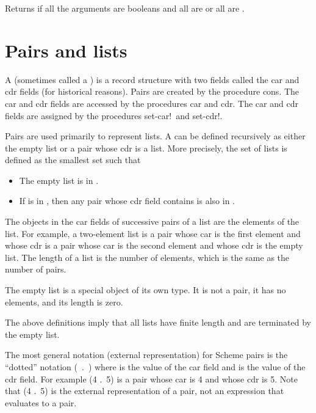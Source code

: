 \begin{entry}{%
}

Returns \schtrue{} if all the arguments are booleans and all 
are \schtrue{} or all are \schfalse{}.

\end{entry}
 
\section{Pairs and lists}
\label{listsection}

A  (sometimes called a ) is a
record structure with two fields called the car and cdr fields (for
historical reasons).  Pairs are created by the procedure {\cf cons}.
The car and cdr fields are accessed by the procedures {\cf car} and
{\cf cdr}.  The car and cdr fields are assigned by the procedures
{\cf set-car!}\ and {\cf set-cdr!}.

Pairs are used primarily to represent lists.  A  can
be defined recursively as either the empty list or a pair whose
cdr is a list.  More precisely, the set of lists is defined as the smallest
set  such that

\begin{itemize}
\item The empty list is in .
\item If  is in , then any pair whose cdr field contains
       is also in .
\end{itemize}

The objects in the car fields of successive pairs of a list are the
elements of the list.  For example, a two-element list is a pair whose car
is the first element and whose cdr is a pair whose car is the second element
and whose cdr is the empty list.  The length of a list is the number of
elements, which is the same as the number of pairs.

The empty list is a special object of its own type.
It is not a pair, it has no elements, and its length is zero.

\begin{note}
The above definitions imply that all lists have finite length and are
terminated by the empty list.
\end{note}

The most general notation (external representation) for Scheme pairs is
the ``dotted'' notation \hbox{\cf ( .\ )} where
 is the value of the car field and  is the value of the
cdr field.  For example {\cf (4 .\ 5)} is a pair whose car is 4 and whose
cdr is 5.  Note that {\cf (4 .\ 5)} is the external representation of a
pair, not an expression that evaluates to a pair.

